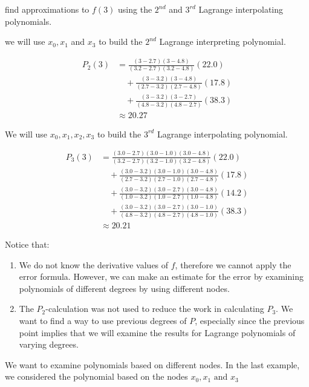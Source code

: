 find approximations to $f(3)$ using the $2^{nd}$ and $3^{rd}$ Lagrange
interpolating polynomials.

\soln we will use $x_0, x_1$ and $x_3$ to build the $2^{nd}$ Lagrange
interpreting polynomial.

\begin{align*}
P_2(3) &= \frac{(3 - 2.7)(3 - 4.8)}{(3.2 - 2.7)(3.2 - 4.8)} (22.0) \\
&\quad + \frac{(3 - 3.2)(3 - 4.8)}{(2.7 - 3.2)(2.7 - 4.8)} (17.8) \\
&\quad + \frac{(3 - 3.2)(3 - 2.7)}{(4.8 - 3.2)(4.8 - 2.7)} (38.3) \\
&\approx 20.27
\end{align*}

We will use $x_0, x_1, x_2, x_3$ to build the $3^{rd}$ Lagrange
interpolating polynomial.

\begin{align*}
P_3(3) &= \frac{(3.0 - 2.7)(3.0 - 1.0)(3.0 - 4.8)}{(3.2 - 2.7)(3.2 - 1.0)(3.2 - 4.8)} (22.0) \\
&\quad + \frac{(3.0 - 3.2)(3.0 - 1.0)(3.0 - 4.8)}{(2.7 - 3.2)(2.7 - 1.0)(2.7 - 4.8)} (17.8) \\
&\quad + \frac{(3.0 - 3.2)(3.0 - 2.7)(3.0 - 4.8)}{(1.0 - 3.2)(1.0 - 2.7)(1.0 - 4.8)} (14.2) \\
&\quad + \frac{(3.0 - 3.2)(3.0 - 2.7)(3.0 - 1.0)}{(4.8 - 3.2)(4.8 - 2.7)(4.8 - 1.0)} (38.3) \\
&\approx 20.21
\end{align*}

Notice that:

\begin{enumerate}
\item We do not know the derivative values of $f$, therefore we cannot apply 
  the error formula. However, we can make an estimate for the error by examining
  polynomials of different degrees by using different nodes.

\item The $P_2$-calculation was not used to reduce the work in calculating $P_3$.
  We want to find a way to use previous degrees of $P$, especially since the 
  previous point implies that we will examine the results for Lagrange 
  polynomials of varying degrees.
\end{enumerate}

\noindent
We want to examine polynomials based on different nodes. In the last example, 
we considered the polynomial based on the nodes $x_0, x_1 \text{ and } x_3$

